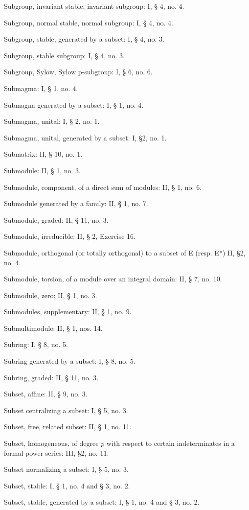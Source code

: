 Subgroup, invariant stable, invariant subgroup: I, § 4, no. 4.

Subgroup, normal stable, normal subgroup: I, § 4, no. 4.

Subgroup, stable, generated by a subset: I, § 4, no. 3.

Subgroup, stable subgroup: I, § 4, no. 3.

Subgroup, Sylow, Sylow p-subgroup: I, § 6, no. 6.

Submagma: I, § 1, no. 4.

Submagna generated by a subset: I, § 1, no. 4.

Submagma, unital: I, § 2, no. 1.

Submagma, unital, generated by a subset: I, §2, no. 1.

Submatrix: II, § 10, no. 1.

Submodule: II, § 1, no. 3.

Submodule, component, of a direct sum of modules: II, § 1, no. 6.

Submodule generated by a family: II, § 1, no. 7.

Submodule, graded: II, § 11, no. 3.

Submodule, irreducible: II, § 2, Exercise 16.

Submodule, orthogonal (or totally orthogonal) to a subset of E (resp. E*) II, §2, no. 4.

Submodule, torsion, of a module over an integral domain: II, § 7, no. 10.

Submodule, zero: II, § 1, no. 3.

Submodules, supplementary: II, § 1, no. 9.

Submultimodule: II, § 1, nos. 14.

Subring: I, § 8, no. 5.

Subring generated by a subset: I, § 8, no. 5.

Subring, graded: II, § 11, no. 3.

Subset, affine: II, § 9, no. 3.

Subset centralizing a subset: I, § 5, no. 3.

Subset, free, related subset: II, § 1, no. 11.

Subset, homogeneous, of degree \(p\) with respect to certain indeterminates in a formal power series: III, §2, no. 11.

Subset normalizing a subset: I, § 5, no. 3.

Subset, stable: I, § 1, no. 4 and § 3, no. 2.

Subset, stable, generated by a subset: I, § 1, no. 4 and § 3, no. 2.

